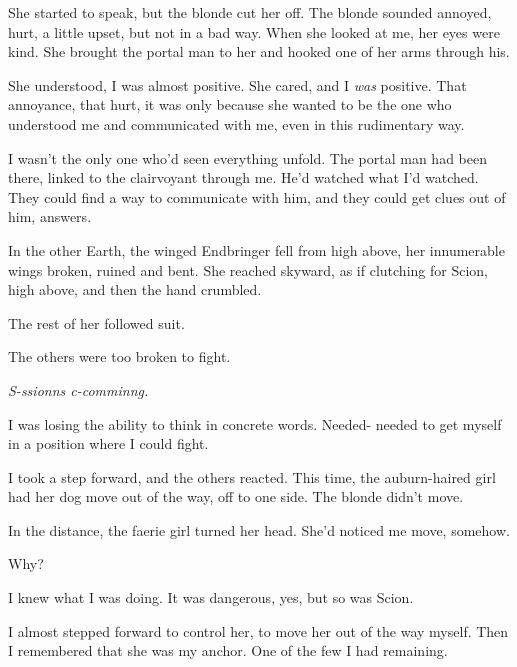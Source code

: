 She started to speak, but the blonde cut her off.  The blonde sounded annoyed, hurt, a little upset, but not in a bad way.  When she looked at me, her eyes were kind.  She brought the portal man to her and hooked one of her arms through his.



She understood, I was almost positive.  She cared, and I \emph{was} positive.  That annoyance, that hurt, it was only because she wanted to be the one who understood me and communicated with me, even in this rudimentary way.



I wasn't the only one who'd seen everything unfold.  The portal man had been there, linked to the clairvoyant through me.  He'd watched what I'd watched.  They could find a way to communicate with him, and they could get clues out of him, answers.



In the other Earth, the winged Endbringer fell from high above, her innumerable wings broken, ruined and bent.  She reached skyward, as if clutching for Scion, high above, and then the hand crumbled.



The rest of her followed suit.



The others were too broken to fight.



\emph{S-ssionns c-comminng.}



I was losing the ability to think in concrete words.  Needed- needed to get myself in a position where I could fight.



I took a step forward, and the others reacted.  This time, the auburn-haired girl had her dog move out of the way, off to one side.  The blonde didn't move.



In the distance, the faerie girl turned her head.  She'd noticed me move, somehow.



Why?



I knew what I was doing.  It was dangerous, yes, but so was Scion.



I almost stepped forward to control her, to move her out of the way myself.  Then I remembered that she was my anchor.  One of the few I had remaining.



